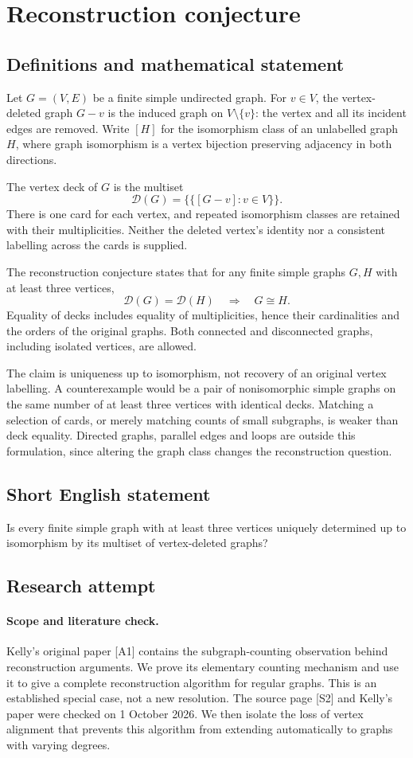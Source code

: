 \documentclass[11pt,a4paper]{article}
\begin{document}
\section*{Reconstruction conjecture}\label{statement}

\subsection{Definitions and mathematical statement}
Let $G=(V,E)$ be a finite simple undirected graph. For $v\in V$, the
vertex-deleted graph $G-v$ is the induced graph on $V\setminus\{v\}$:
the vertex and all its incident edges are removed. Write $[H]$ for the
isomorphism class of an unlabelled graph $H$, where graph isomorphism is
a vertex bijection preserving adjacency in both directions.

The vertex deck of $G$ is the multiset
\[
 \mathcal D(G)=\{\!\{[G-v]:v\in V\}\!\}.
\]
There is one card for each vertex, and repeated isomorphism classes are
retained with their multiplicities. Neither the deleted vertex's identity
nor a consistent labelling across the cards is supplied.

The reconstruction conjecture states that for any finite simple graphs
$G,H$ with at least three vertices,
\[
 \mathcal D(G)=\mathcal D(H)\quad\Longrightarrow\quad G\cong H.
\]
Equality of decks includes equality of multiplicities, hence their
cardinalities and the orders of the original graphs. Both connected and
disconnected graphs, including isolated vertices, are allowed.

The claim is uniqueness up to isomorphism, not recovery of an original
vertex labelling. A counterexample would be a pair of nonisomorphic
simple graphs on the same number of at least three vertices with identical
decks. Matching a selection of cards, or merely matching counts of small
subgraphs, is weaker than deck equality. Directed graphs, parallel edges
and loops are outside this formulation, since altering the graph class
changes the reconstruction question.
\subsection{Short English statement}
Is every finite simple graph with at least three vertices uniquely determined up to isomorphism by its multiset of vertex-deleted graphs?
\subsection{Research attempt}
\paragraph{Scope and literature check.}
Kelly's original paper [A1] contains the subgraph-counting observation behind
reconstruction arguments. We prove its elementary counting mechanism and use
it to give a complete reconstruction algorithm for regular graphs. This is
an established special case, not a new resolution. The source page [S2] and
Kelly's paper were checked on 1 October 2026. We then isolate the loss of
vertex alignment that prevents this algorithm from extending automatically
to graphs with varying degrees.
\end{document}
